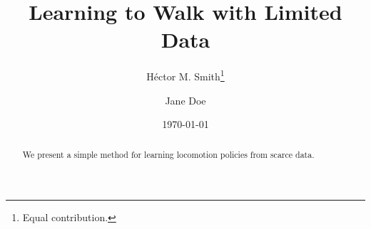 \documentclass[11pt]{article}
\title{Learning to Walk with Limited Data}
\author{H\'{e}ctor M. Smith\thanks{Equal contribution.} \and Jane Doe}
\date{\today}
\begin{document}
\maketitle
\begin{abstract}
We present a simple method for learning locomotion policies from scarce data.
\end{abstract}



\end{document}
